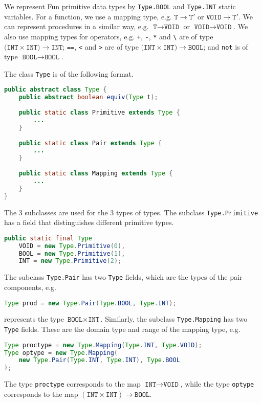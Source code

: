 \documentclass[a4paper, openany]{memoir}
\begin{document}
We represent Fun primitive data types by \texttt{Type.BOOL} and \texttt{Type.INT} static variables. For a function, we use a mapping type, e.g. $\texttt{T} \to \texttt{T}'$ or $\texttt{VOID} \to \texttt{T}'$. We can represent procedures in a similar way, e.g. $\texttt{T} \to \texttt{VOID}$ or $\texttt{VOID} \to \texttt{VOID}$. We also use mapping types for operators, e.g. \texttt{+}, \texttt{-}, \texttt{*} and \texttt{\textbackslash} are of type $\texttt{(INT} \times \texttt{INT)} \to \texttt{INT}$; \texttt{==}, \texttt{<} and \texttt{>} are of type $(\texttt{INT} \times \texttt{INT)} \to \texttt{BOOL}$; and \texttt{not} is of type $\texttt{BOOL} \to \texttt{BOOL}$.

The class \texttt{Type} is of the following format.
\begin{lstlisting}[language=java]
public abstract class Type {
    public abstract boolean equiv(Type t);
    
    public static class Primitive extends Type {
        ...
    }
    
    public static class Pair extends Type {
        ...
    }
    
    public static class Mapping extends Type {
        ...
    }
}
\end{lstlisting}
The 3 subclasses are used for the 3 types of types. The subclass \texttt{Type.Primitive} has a field that distinguishes different primitive types.
\begin{lstlisting}[language=java]
public static final Type 
    VOID = new Type.Primitive(0),
    BOOL = new Type.Primitive(1),
    INT = new Type.Primitive(2);
\end{lstlisting}
The subclass \texttt{Type.Pair} has two \texttt{Type} fields, which are the types of the pair components, e.g.
\begin{lstlisting}[language=java]
Type prod = new Type.Pair(Type.BOOL, Type.INT);
\end{lstlisting}
represents the type $\texttt{BOOL} \times \texttt{INT}$. Similarly, the subclass \texttt{Type.Mapping} has two \texttt{Type} fields. These are the domain type and range of the mapping type, e.g.
\begin{lstlisting}[language=java]
Type proctype = new Type.Mapping(Type.INT, Type.VOID);
Type optype = new Type.Mapping(
    new Type.Pair(Type.INT, Type.INT), Type.BOOL
);
\end{lstlisting}
The type \texttt{proctype} corresponds to the map $\texttt{INT} \to \texttt{VOID}$, while the type \texttt{optype} corresponds to the map $(\texttt{INT} \times \texttt{INT}) \to \texttt{BOOL}$.
\end{document}
